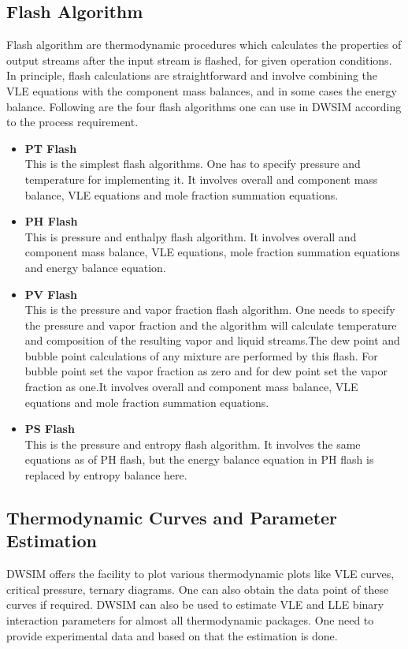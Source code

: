 \documentclass[12pt]{report}
\begin{document}
\subsection{Flash Algorithm}
Flash algorithm are thermodynamic procedures which calculates the properties of output streams after the input stream is flashed, for given operation conditions. In principle, flash calculations are straightforward and involve combining the VLE equations with the component mass balances, and in some cases the energy balance. Following are the four flash algorithms one can use in DWSIM according to the process requirement.

\begin{itemize}
\item{\textbf{PT Flash}} \\
This is the simplest flash algorithms. One has to specify pressure and temperature for implementing it. It involves overall and component mass balance, VLE equations and mole fraction summation equations.
\item{\textbf{PH Flash}} \\
This is pressure and enthalpy flash algorithm. It involves overall and component mass balance, VLE equations, mole fraction summation equations and energy balance equation.
\item{\textbf{PV Flash}} \\
This is the pressure and vapor fraction flash algorithm. One needs to specify the pressure and vapor fraction and the algorithm will calculate temperature and composition of the resulting vapor and liquid streams.The dew point and bubble point calculations of any mixture are performed by this flash. For bubble point set the vapor fraction as zero and for dew point set the vapor fraction as one.It involves overall and component mass balance, VLE equations and mole fraction summation equations.
\item{\textbf{PS Flash}} \\
This is the pressure and entropy flash algorithm. It involves the same equations as of PH flash, but the energy balance equation in PH flash is replaced by entropy balance here.
\end{itemize}

\subsection {Thermodynamic Curves and Parameter Estimation}
DWSIM offers the facility to plot various thermodynamic plots like VLE curves, critical pressure, ternary diagrams. One can also obtain the data point of these curves if required.
DWSIM can also be used to estimate VLE and LLE binary interaction parameters for almost all thermodynamic packages. One need to provide experimental data and based on that the estimation is done.
\end{document}
